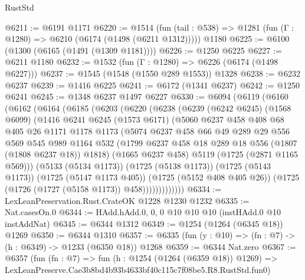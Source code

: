 \begin{lexlean}{RustStd}
\begin{coremodule}
@6211 := @6191 @1171
@6220 := @1514
    (fun (tail : @538) => @1281 (fun (Γ : @1280) => @6210 (@6174 (@1498 (@6211 @1312)))))
    @1180
@6225 := @6100 (@1300 (@6165 (@1491 (@1309 @1181))))
@6226 := @1250 @6225
@6227 := @6211 @1180
@6232 := @1532 (fun (Γ : @1280) => @6226 (@6174 (@1498 @6227)))
@6237 := @1545 (@1548 (@1550 @289 @1553)) @1328
@6238 := @6232 @6237
@6239 := @1416 @6225
@6241 := @6172 (@1341 @6237)
@6242 := @1250 @6241
@6245 := @1348 @6237 @1497 @6227
@6330 := @6094
    (@6119
      (@6160
        (@6162
          (@6164
            (@6185
              (@6203
                (@6220
                  (@6238
                    (@6239
                      (@6242 @6245)
                      (@1568 @6099)
                      (@1416
                        @6241
                        @6245
                        (@1573 @6171)
                        (@5060
                          @6237
                          @458
                          @408
                          @68
                          @405
                          @26
                          @1171
                          @1178
                          @1173
                          (@5074
                            @6237
                            @458
                            @66
                            @49
                            @289
                            @29
                            @556
                            @569
                            @545
                            @989
                            @1164
                            @532
                            (@1799 @6237 @458 @18 @289 @18 @556 (@1807 (@1808 @6237 @18)) @1818)
                            (@1665 @6237 @458)
                            @5119
                            (@1725 (@2871 @1165 @569)))
                          (@5133 (@5134 @1173))
                          (@1725 (@5138 @1173))
                          (@1725 (@5143 @1173))
                          (@1725 (@5147 @1173 @405))
                          (@1725 (@5152 @408 @405 @26))
                          (@1725 (@1726 (@1727 (@5158 @1173)) @458)))))))))))))
@6334 := LexLeanPreservation.Rust.CrateOK @1228 @1230 @1232
@6335 := Nat.casesOn.{0}
@6344 := HAdd.hAdd.{0, 0, 0} @10 @10 @10 (instHAdd.{0} @10 instAddNat)
@6345 := @6344 @1312
@6349 := @1254 (@1264 (@6345 @18)) @1269
@6350 := @6344 @1310
@6357 := @6335 (fun (y : @10) => (fn : @7) -> (h : @6349) -> @1233 (@6350 @18)) @1268
@6359 := @6344 Nat.zero
@6367 := @6357
    (fun (fn : @7) =>
    fun (h : @1254 (@1264 (@6359 @18)) @1269) =>
    LexLeanPreserve.Cae3b8bd4b93b4633bf40c115c7f08be5.R8.RustStd.fun0)

\end{coremodule}
\end{lexlean}

